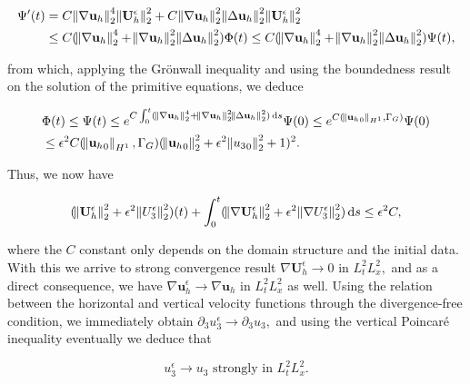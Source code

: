 \documentclass[11pt]{article}
\newcommand*\diff{\mathop{}\!\mathrm{d}}
\begin{document}
\begin{equation}
  \begin{split} \nonumber
   \Psi'(t) & = C \norm{\nabla \mathbf{u}_h}_2^4 \norm{\mathbf{U}_h^\epsilon}_2^2 + C \norm{\nabla \mathbf{u}_h}_2^2  \norm{\Delta \mathbf{u}_h}_2^2 \norm{\mathbf{U}_h^\epsilon}_2^2 \\
   & \leq C (\norm{\nabla \mathbf{u}_h}_2^4 + \norm{\nabla \mathbf{u}_h}_2^2  \norm{\Delta \mathbf{u}_h}_2^2) \Phi (t) \leq C (\norm{\nabla \mathbf{u}_h}_2^4 + \norm{\nabla \mathbf{u}_h}_2^2  \norm{\Delta \mathbf{u}_h}_2^2)\Psi(t),
  \end{split}
\end{equation}

from which, applying the Gr\"onwall inequality and using the boundedness result on the solution of the primitive equations, we deduce

\begin{equation}
  \begin{split} \nonumber
    & \Phi (t) \leq \Psi (t) \leq e^{C \int_0 ^ t (\norm{\nabla \mathbf{u}_h}_2^4 + \norm{\nabla \mathbf{u}_h}_2^2  \norm{\Delta \mathbf{u}_h}_2^2) \diff s} \Psi (0) \leq e^{C(\norm{{\mathbf{u}_h}_0}_{H^1}, \Gamma_G)} \Psi(0) \\
    & \leq \epsilon^2 C(\norm{{\mathbf{u}_h}_0}_{H^1}, \Gamma_G) (\norm{{\mathbf{u}_h}_0}_2^2 + \epsilon^2 \norm{{u_3}_0}_2^2 + 1)^2.
  \end{split}
\end{equation}

Thus, we now have

$$ (\norm{\mathbf{U}_h^\epsilon}_2^2 + \epsilon^2 \norm{U_3^\epsilon}_2^2)(t) + \int_0^t (\norm{\nabla \mathbf{U}_h^\epsilon}_2^2 + \epsilon^2 \norm{\nabla U_3^\epsilon}_2^2) \diff s \leq \epsilon^2 C,$$

where the $C$ constant only depends on the domain structure and the initial data. With this we arrive to strong convergence result $\nabla \mathbf{U}_h^\epsilon \to 0$ in $L^2_t L^2_x,$ and as a direct consequence, we have $\nabla \mathbf{u}_h^\epsilon \to \nabla \mathbf{u}_h$ in $L^2_t L^2_x$ as well. Using the relation between the horizontal and vertical velocity functions through the divergence-free condition, we immediately obtain $\partial_3 u_3^\epsilon \to \partial_3 u_3,$ and using the vertical Poincar\'e inequality eventually we deduce that

\begin{equation}\label{strongconvresultu3}u_3^\epsilon \to u_3 \text{ strongly in } L^2_t L^2_x.\end{equation}
\end{document}
